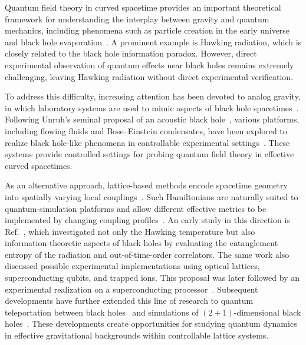 \documentclass[reprint,amsmath,amssymb,aps,prb]{revtex4-2}
\begin{document}
Quantum field theory in curved spacetime provides an important theoretical framework for understanding the interplay between gravity and quantum mechanics, including phenomena such as particle creation in the early universe and black hole evaporation~\cite{Wald2012,PhysRevLett.21.562}. A prominent example is Hawking radiation\cite{Hawking1975}, which is closely related to the black hole information paradox. However, direct experimental observation of quantum effects near black holes remains extremely challenging, leaving Hawking radiation without direct experimental verification.

To address this difficulty, increasing attention has been devoted to analog gravity, in which laboratory systems are used to mimic aspects of black hole spacetimes~\cite{Almeida2023}. Following Unruh's seminal proposal of an acoustic black hole~\cite{PhysRevLett.46.1351}, various platforms, including flowing fluids and Bose--Einstein condensates, have been explored to realize black hole-like phenomena in controllable experimental settings~\cite{Steinhauer2016}. These systems provide controlled settings for probing quantum field theory in effective curved spacetimes.

As an alternative approach, lattice-based methods encode spacetime geometry into spatially varying local couplings~\cite{PhysRevResearch.3.L022022,PhysRevLett.130.016701,marra2024metricinducednonhermitianphysics}. Such Hamiltonians are naturally suited to quantum-simulation platforms and allow different effective metrics to be implemented by changing coupling profiles~\cite{PhysRevLett.120.160403}. An early study in this direction is Ref.~\cite{PhysRevResearch.2.023107}, which investigated not only the Hawking temperature but also information-theoretic aspects of black holes by evaluating the entanglement entropy of the radiation and out-of-time-order correlators. The same work also discussed possible experimental implementations using optical lattices, superconducting qubits, and trapped ions. This proposal was later followed by an experimental realization on a superconducting processor~\cite{Shi2023}. Subsequent developments have further extended this line of research to quantum teleportation between black holes~\cite{PhysRevLett.130.016701,Daniel2025,daniel2025quantumteleportationsimulatedbinary} and simulations of $(2+1)$-dimensional black holes~\cite{benhemou2025probingquantumpropertiesblack}. These developments create opportunities for studying quantum dynamics in effective gravitational backgrounds within controllable lattice systems.
\end{document}
